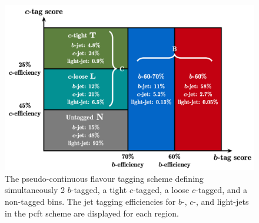 \begin{itemize}[leftmargin=*]

\begin{figure}[h!]
  \center
    \begin{minipage}[c]{0.65\textwidth}
      \includegraphics[width=\textwidth]{Images/VH/pseudocontinuous.png}
    \end{minipage}
    \begin{minipage}[c]{0.34\textwidth}
      \caption{The pseudo-continuous flavour tagging scheme defining simultaneously 2 $b$-tagged, a tight $c$-tagged, a loose $c$-tagged, and a non-tagged bins. The jet tagging efficiencies for $b$-, $c$-, and light-jets in the \gls{pcft} scheme are displayed for each region.} 
      \label{fig:pseudotag}
    \end{minipage}
\end{figure}


\end{itemize}

